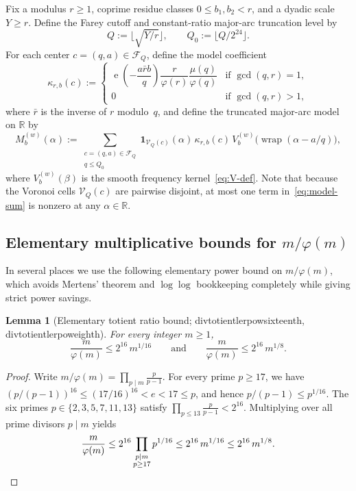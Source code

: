 \documentclass[11pt,reqno]{amsart}
\numberwithin{equation}{section}
\newtheorem{lemma}[theorem]{Lemma}
\theoremstyle{definition}
\newcommand{\R}{\mathbb{R}}
\newcommand{\1}{\mathbf{1}}
\newcommand{\e}{\operatorname{e}}
\newcommand{\V}{\mathcal{V}}
\newcommand{\lean}[1]{{\footnotesize\ttfamily\renewcommand{\_}{\textunderscore\allowbreak}#1}}
\begin{document}
Fix a modulus $r \ge 1$, coprime residue classes $0 \le b_1, b_2 < r$, and a dyadic scale $Y \ge r$. Define the Farey cutoff and constant-ratio major-arc truncation level by
\begin{equation}\label{eq:Q-Q0}
  Q := \lfloor \sqrt{Y/r} \rfloor, \qquad Q_0 := \lfloor Q / 2^{24} \rfloor.
\end{equation}
For each center $c = (q, a) \in \mathcal{F}_Q$, define the model coefficient
\begin{equation}\label{eq:model-coeff}
  \kappa_{r,b}(c) := \begin{cases}
    \e\!\left(-\dfrac{a\bar{r} b}{q}\right)\dfrac{r}{\varphi(r)}\dfrac{\mu(q)}{\varphi(q)} & \text{if } \gcd(q, r) = 1,\\[8pt]
    0 & \text{if } \gcd(q, r) > 1,
  \end{cases}
\end{equation}
where $\bar{r}$ is the inverse of $r$ modulo~$q$, and define the truncated major-arc model on $\R$ by
\begin{equation}\label{eq:model-sum}
  M_b^{(w)}(\alpha) := \sum_{\substack{c = (q, a) \in \mathcal{F}_Q \\ q \le Q_0}} \1_{\V_Q(c)}(\alpha)\, \kappa_{r, b}(c)\, V_b^{(w)}\!\bigl(\operatorname{wrap}(\alpha - a/q)\bigr),
\end{equation}
where $V_b^{(w)}(\beta)$ is the smooth frequency kernel~\eqref{eq:V-def}. Note that because the Voronoi cells $\V_Q(c)$ are pairwise disjoint, at most one term in~\eqref{eq:model-sum} is nonzero at any $\alpha \in \R$.

\subsection{Elementary multiplicative bounds for \texorpdfstring{$m/\varphi(m)$}{m/phi(m)}}

In several places we use the following elementary power bound on $m/\varphi(m)$, which avoids Mertens' theorem and $\log\log$ bookkeeping completely while giving strict power savings.

\begin{lemma}[Elementary totient ratio bound; \lean{div\_totient\_le\_rpow\_sixteenth}, \lean{div\_totient\_le\_rpow\_eighth}]
\label{lem:totient-pow}
For every integer $m \ge 1$,
\[
  \frac{m}{\varphi(m)} \le 2^{16}\, m^{1/16} \qquad\text{and}\qquad \frac{m}{\varphi(m)} \le 2^{16}\, m^{1/8}.
\]
\end{lemma}

\begin{proof}
Write $m/\varphi(m) = \prod_{p \mid m} \frac{p}{p-1}$. For every prime $p \ge 17$, we have $(p/(p-1))^{16} \le (17/16)^{16} < e < 17 \le p$, and hence $p/(p-1) \le p^{1/16}$. The six primes $p \in \{2, 3, 5, 7, 11, 13\}$ satisfy $\prod_{p \le 13} \frac{p}{p-1} < 2^{16}$. Multiplying over all prime divisors $p \mid m$ yields
\[
  \frac{m}{\varphi(m)} \le 2^{16} \prod_{\substack{p \mid m \\ p \ge 17}} p^{1/16} \le 2^{16}\, m^{1/16} \le 2^{16}\, m^{1/8}. \qedhere
\]
\end{proof}
\end{document}
